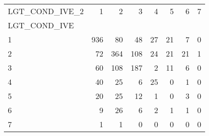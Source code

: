 \begin{tabular}{lrrrrrrr}
LGT\_COND\_IVE\_2 &    1 &    2 &    3 &   4 &   5 &   6 &  7 \\
LGT\_COND\_IVE &      &      &      &     &     &     &    \\
\hline
1            &  936 &   80 &   48 &  27 &  21 &   7 &  0 \\
2            &   72 &  364 &  108 &  24 &  21 &  21 &  1 \\
3            &   60 &  108 &  187 &   2 &  11 &   6 &  0 \\
4            &   40 &   25 &    6 &  25 &   0 &   1 &  0 \\
5            &   20 &   25 &   12 &   1 &   0 &   3 &  0 \\
6            &    9 &   26 &    6 &   2 &   1 &   1 &  0 \\
7            &    1 &    1 &    0 &   0 &   0 &   0 &  0 \\
\end{tabular}









